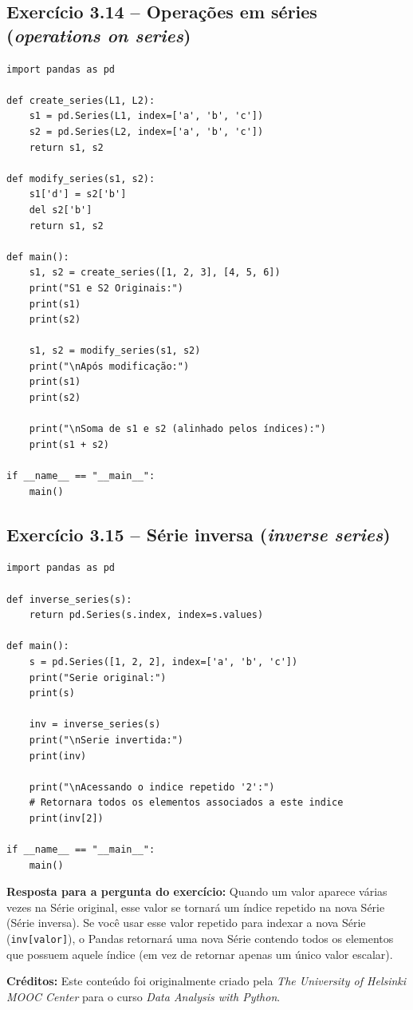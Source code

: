 \documentclass[11pt,a4paper]{article}
\begin{document}
\subsection*{Exercício 3.14 -- Operações em séries (\textit{operations on series})}
\begin{solucao}
\begin{lstlisting}
import pandas as pd

def create_series(L1, L2):
    s1 = pd.Series(L1, index=['a', 'b', 'c'])
    s2 = pd.Series(L2, index=['a', 'b', 'c'])
    return s1, s2

def modify_series(s1, s2):
    s1['d'] = s2['b']
    del s2['b']
    return s1, s2

def main():
    s1, s2 = create_series([1, 2, 3], [4, 5, 6])
    print("S1 e S2 Originais:")
    print(s1)
    print(s2)
    
    s1, s2 = modify_series(s1, s2)
    print("\nApós modificação:")
    print(s1)
    print(s2)
    
    print("\nSoma de s1 e s2 (alinhado pelos índices):")
    print(s1 + s2)

if __name__ == "__main__":
    main()
\end{lstlisting}
\end{solucao}

\subsection*{Exercício 3.15 -- Série inversa (\textit{inverse series})}
\begin{solucao}
\begin{lstlisting}
import pandas as pd

def inverse_series(s):
    return pd.Series(s.index, index=s.values)

def main():
    s = pd.Series([1, 2, 2], index=['a', 'b', 'c'])
    print("Serie original:")
    print(s)
    
    inv = inverse_series(s)
    print("\nSerie invertida:")
    print(inv)
    
    print("\nAcessando o indice repetido '2':")
    # Retornara todos os elementos associados a este indice
    print(inv[2]) 

if __name__ == "__main__":
    main()
\end{lstlisting}

\textbf{Resposta para a pergunta do exercício:} Quando um valor aparece várias vezes na Série original, esse valor se tornará um índice repetido na nova Série (Série inversa). Se você usar esse valor repetido para indexar a nova Série (\texttt{inv[valor]}), o Pandas retornará uma nova Série contendo todos os elementos que possuem aquele índice (em vez de retornar apenas um único valor escalar).
\end{solucao}

\vspace{2em}
\noindent\textbf{Créditos:} Este conteúdo foi originalmente criado pela \textit{The University of Helsinki MOOC Center} para o curso \textit{Data Analysis with Python}.
\end{document}
